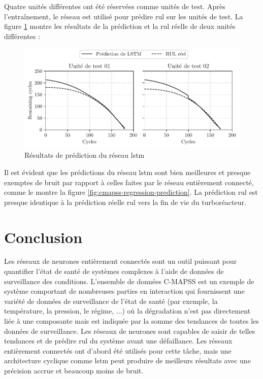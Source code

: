 Quatre unités différentes ont été réservées comme unités de test. Après l'entraînement, le réseau est utilisé pour prédire \acrshort{rul} sur les unités de test. La figure \ref{fig:cmapss-lstm-prediction} montre les résultats de la prédiction et la \acrshort{rul} réelle de deux unités différentes :

\begin{figure}[h]
    \centering
    \includegraphics{figures/cmapss_lstm_regression_predictions_fr.pdf}
    \caption{Résultats de prédiction du réseau \acrshort{lstm}}
    \label{fig:cmapss-lstm-prediction}
\end{figure}

Il est évident que les prédictions du réseau \acrshort{lstm} sont bien meilleures et presque exemptes de bruit par rapport à celles faites par le réseau entièrement connecté, comme le montre la figure \ref{fig:cmapss-regression-prediction}. La prédiction \acrshort{rul} est presque identique à la prédiction réelle \acrshort{rul} vers la fin de vie du turboréacteur.

\section{Conclusion}
Les réseaux de neurones entièrement connectés sont un outil puissant pour quantifier l'état de santé de systèmes complexes à l'aide de données de surveillance des conditions. L'ensemble de données C-MAPSS est un exemple de système comportant de nombreuses parties en interaction qui fournissent une variété de données de surveillance de l'état de santé (par exemple, la température, la pression, le régime, ...) où la dégradation n'est pas directement liée à une composante mais est indiquée par la somme des tendances de toutes les données de surveillance. Les réseaux de neurones sont capables de saisir de telles tendances et de prédire \acrshort{rul} du système avant une défaillance. Les réseaux entièrement connectés ont d'abord été utilisés pour cette tâche, mais une architecture cyclique comme \acrshort{lstm} peut produire de meilleurs résultats avec une précision accrue et beaucoup moins de bruit.

